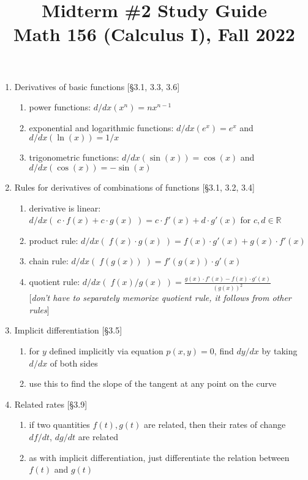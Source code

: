 \documentclass[11pt]{article}
\title{Midterm \#2 Study Guide \\ Math 156 (Calculus I), Fall 2022}
\date{}
\begin{document}
\maketitle

\thispagestyle{empty}

\vspace{-1.75cm}

\begin{enumerate}
\item Derivatives of basic functions [\S 3.1, 3.3, 3.6]
\begin{enumerate}
\item power functions: $d/dx (x^n) = n x^{n-1}$
\item exponential and logarithmic functions: $d/dx(e^x) = e^x$ and $d/dx(\ln(x)) = 1/x$
\item trigonometric functions: $d/dx(\sin(x)) = \cos(x)$ and $d/dx(\cos(x)) = -\sin(x)$
\end{enumerate}

\item Rules for derivatives of combinations of functions [\S 3.1, 3.2, 3.4]
\begin{enumerate}
\item derivative is linear: $d/dx( \; c\cdot f(x) + c\cdot g(x) \;) = c \cdot f'(x) + d \cdot g'(x)$ for $c,d \in \mathbb{R}$
\item product rule: $d/dx( \; f(x)\cdot g(x) \;) = f(x) \cdot g'(x) + g(x) \cdot f'(x)$
\item chain rule: $d/dx (\; f(g(x)) \; ) = f'(g(x)) \cdot g'(x)$
\item quotient rule: $\displaystyle d/dx (\; f(x)/g(x) \;) = \frac{g(x)\cdot f'(x) - f(x)\cdot g'(x)}{(g(x))^2}$\\ {[\emph{don't have to separately memorize quotient rule, it follows from other rules}]}
\end{enumerate}

\item Implicit differentiation [\S 3.5]
\begin{enumerate}
\item for $y$ defined implicitly via equation $p(x,y)=0$, find $dy/dx$ by taking $d/dx$ of both sides
\item use this to find the slope of the tangent at any point on the curve
\end{enumerate}

\item Related rates [\S 3.9]
\begin{enumerate}
\item if two quantities $f(t), g(t)$ are related, then their rates of change $df/dt$, $dg/dt$ are related
\item as with implicit differentiation, just differentiate the relation between $f(t)$ and $g(t)$
\end{enumerate}


\end{enumerate}
\end{document}
